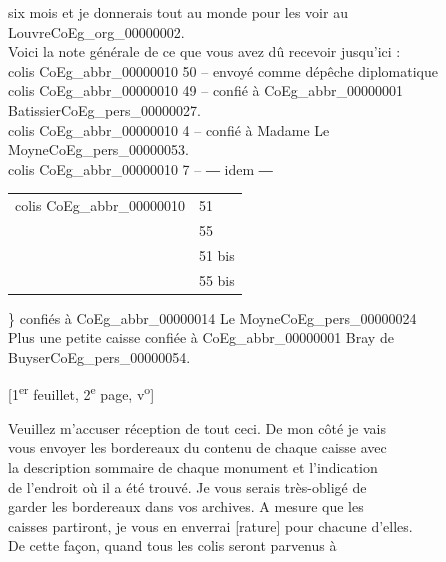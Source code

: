 \documentclass{book}
\begin{document}
six mois et je donnerais tout au monde pour les voir au\\
Louvre\gls{CoEg_org_00000002}.\\
\indent Voici la note générale de ce que vous avez dû recevoir jusqu’ici :\\
\hspace*{1cm} colis \gls{CoEg_abbr_00000010} 50 – envoyé comme dépêche diplomatique\\
\hspace*{1cm} colis \gls{CoEg_abbr_00000010} 49 – confié à \gls{CoEg_abbr_00000001} Batissier\gls{CoEg_pers_00000027}.\\
\hspace*{1cm} colis \gls{CoEg_abbr_00000010} 4 – confié à Madame Le Moyne\gls{CoEg_pers_00000053}.\\
\hspace*{1cm} colis \gls{CoEg_abbr_00000010} 7 – \hspace*{1cm} 	― idem ―\\
\hspace*{1cm}\begin{tabular}{ r l }
  colis \gls{CoEg_abbr_00000010} & 51 \\
   & 55 \\
   & 51 bis \\
   & 55 bis
\end{tabular} \Bigg\}
\hspace*{1cm} confiés à \gls{CoEg_abbr_00000014} Le Moyne\gls{CoEg_pers_00000024}\\
\hspace*{1cm}Plus une petite caisse confiée à \gls{CoEg_abbr_00000001} {Bray de Buyser\gls{CoEg_pers_00000054}}.
{\footnotesize \begin{center} {[1\textsuperscript{er} feuillet, 2\textsuperscript{e} page, v\textsuperscript{o}]}\end{center}}
\indent Veuillez m’accuser réception de tout ceci. De mon côté je vais\\
vous envoyer les bordereaux du contenu de chaque caisse avec\\
la description sommaire de chaque monument et l’indication\\
de l’endroit où il a été trouvé. Je vous serais très-obligé de\\
garder les bordereaux dans vos archives. A mesure que les\\
caisses partiront, je vous en enverrai [rature] pour chacune d’elles.\\
De cette façon, quand tous les colis seront parvenus à\\
\end{document}
